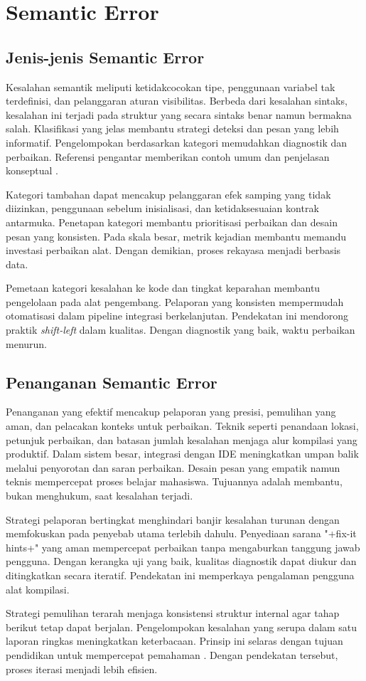 \documentclass[../main.tex]{subfiles}
\begin{document}
\section{Semantic Error}
\subsection{Jenis-jenis Semantic Error}
Kesalahan semantik meliputi ketidakcocokan tipe, penggunaan variabel tak terdefinisi, dan pelanggaran aturan visibilitas. Berbeda dari kesalahan sintaks, kesalahan ini terjadi pada struktur yang secara sintaks benar namun bermakna salah. Klasifikasi yang jelas membantu strategi deteksi dan pesan yang lebih informatif. Pengelompokan berdasarkan kategori memudahkan diagnostik dan perbaikan. Referensi pengantar memberikan contoh umum dan penjelasan konseptual \citep{WikiSemanticError}.

Kategori tambahan dapat mencakup pelanggaran efek samping yang tidak diizinkan, penggunaan sebelum inisialisasi, dan ketidaksesuaian kontrak antarmuka. Penetapan kategori membantu prioritisasi perbaikan dan desain pesan yang konsisten. Pada skala besar, metrik kejadian membantu memandu investasi perbaikan alat. Dengan demikian, proses rekayasa menjadi berbasis data.

Pemetaan kategori kesalahan ke kode dan tingkat keparahan membantu pengelolaan pada alat pengembang. Pelaporan yang konsisten mempermudah otomatisasi dalam pipeline integrasi berkelanjutan. Pendekatan ini mendorong praktik \emph{shift-left} dalam kualitas. Dengan diagnostik yang baik, waktu perbaikan menurun.

\subsection{Penanganan Semantic Error}
Penanganan yang efektif mencakup pelaporan yang presisi, pemulihan yang aman, dan pelacakan konteks untuk perbaikan. Teknik seperti penandaan lokasi, petunjuk perbaikan, dan batasan jumlah kesalahan menjaga alur kompilasi yang produktif. Dalam sistem besar, integrasi dengan IDE meningkatkan umpan balik melalui penyorotan dan saran perbaikan. Desain pesan yang empatik namun teknis mempercepat proses belajar mahasiswa. Tujuannya adalah membantu, bukan menghukum, saat kesalahan terjadi.

Strategi pelaporan bertingkat menghindari banjir kesalahan turunan dengan memfokuskan pada penyebab utama terlebih dahulu. Penyediaan sarana "+fix-it hints+" yang aman mempercepat perbaikan tanpa mengaburkan tanggung jawab pengguna. Dengan kerangka uji yang baik, kualitas diagnostik dapat diukur dan ditingkatkan secara iteratif. Pendekatan ini memperkaya pengalaman pengguna alat kompilasi.

Strategi pemulihan terarah menjaga konsistensi struktur internal agar tahap berikut tetap dapat berjalan. Pengelompokan kesalahan yang serupa dalam satu laporan ringkas meningkatkan keterbacaan. Prinsip ini selaras dengan tujuan pendidikan untuk mempercepat pemahaman \citep{Mogensen2010}. Dengan pendekatan tersebut, proses iterasi menjadi lebih efisien.
\end{document}
